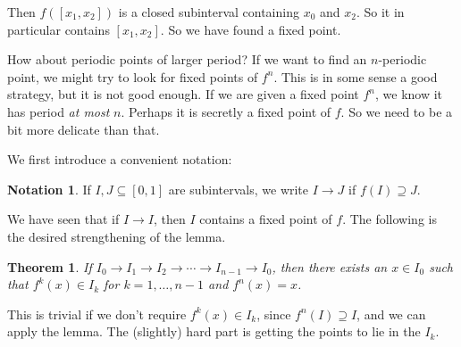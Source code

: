 \documentclass{shortart}
\newtheorem*{thm}{Theorem}
\theoremstyle{definition}
\newtheorem*{notation}{Notation}
\begin{document}
\begin{center}
\end{center}

Then $f([x_1, x_2])$ is a closed subinterval containing $x_0$ and $x_2$. So it in particular contains $[x_1, x_2]$. So we have found a fixed point.

How about periodic points of larger period? If we want to find an $n$-periodic point, we might try to look for fixed points of $f^n$. This is in some sense a good strategy, but it is not good enough. If we are given a fixed point $f^n$, we know it has period \emph{at most} $n$. Perhaps it is secretly a fixed point of $f$. So we need to be a bit more delicate than that.

We first introduce a convenient notation:

\begin{notation}
  If $I, J \subseteq [0, 1]$ are subintervals, we write $I \to J$ if $f(I) \supseteq J$.
\end{notation}

We have seen that if $I \to I$, then $I$ contains a fixed point of $f$. The following is the desired strengthening of the lemma.

\begin{thm}
  If $I_0 \to I_1 \to I_2 \to \cdots \to I_{n-1} \to I_0$, then there exists an $x \in I_0$ such that $f^k(x) \in I_k$ for $k = 1, \ldots, n-1$ and $f^n(x) = x$.
\end{thm}

This is trivial if we don't require $f^k(x) \in I_k$, since $f^n(I) \supseteq I$, and we can apply the lemma. The (slightly) hard part is getting the points to lie in the $I_k$.
\end{document}
